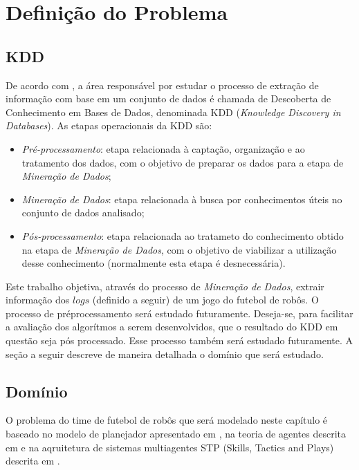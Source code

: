 \chapter{Definição do Problema}\label{cap:def_problema}

\section{KDD}

De acordo com \cite{passos2005datamining}, a área responsável por estudar o processo de extração de informação com base em um conjunto de dados é
chamada de Descoberta de Conhecimento em Bases de Dados, denominada
KDD (\textit{Knowledge Discovery in Databases}). As etapas operacionais da KDD são:
\begin{itemize}
  \item \textit{Pré-processamento}: etapa relacionada à captação,
        organização e ao tratamento dos dados, com o objetivo de
        preparar os dados para a etapa de \textit{Mineração de Dados};
  \item \textit{Mineração de Dados}: etapa relacionada à busca por
        conhecimentos úteis no conjunto de dados analisado;
  \item \textit{Pós-processamento}: etapa relacionada ao tratameto do
        conhecimento obtido na etapa de \textit{Mineração de Dados}, com
        o objetivo de viabilizar a utilização desse conhecimento
        (normalmente esta etapa é desnecessária).
\end{itemize}

Este trabalho objetiva, através do processo de \textit{Mineração de Dados}, extrair informação dos $logs$ (definido a seguir)
de um jogo do futebol de robôs. O processo de préprocessamento será estudado futuramente. Deseja-se, para facilitar a avaliação dos algorítmos a serem desenvolvidos, que o resultado do KDD em questão seja pós processado. Esse processo também será estudado futuramente.
A seção a seguir descreve de maneira detalhada o domínio que será estudado.

\section{Domínio}

O problema do time de futebol de robôs que será modelado neste capítulo é baseado no modelo de planejador apresentado em \cite{zickler}, na teoria
de agentes descrita em \cite{russellnorvig} e na aqruitetura
de sistemas multiagentes STP (Skills, Tactics and Plays) descrita em \cite{bowling2003plays}.




